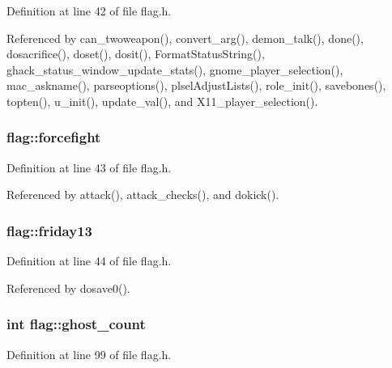Definition at line 42 of file flag.\+h.



Referenced by can\+\_\+twoweapon(), convert\+\_\+arg(), demon\+\_\+talk(), done(), dosacrifice(), doset(), dosit(), Format\+Status\+String(), ghack\+\_\+status\+\_\+window\+\_\+update\+\_\+stats(), gnome\+\_\+player\+\_\+selection(), mac\+\_\+askname(), parseoptions(), plsel\+Adjust\+Lists(), role\+\_\+init(), savebones(), topten(), u\+\_\+init(), update\+\_\+val(), and X11\+\_\+player\+\_\+selection().

\hypertarget{structflag_a527b68a0e2b522d3233eff485aa5f3fc}{
\subsubsection[{forcefight}]{ flag\+::forcefight}}\label{structflag_a527b68a0e2b522d3233eff485aa5f3fc}


Definition at line 43 of file flag.\+h.



Referenced by attack(), attack\+\_\+checks(), and dokick().

\hypertarget{structflag_acf8e0f21621c7af03112ca1280d2bf2e}{
\subsubsection[{friday13}]{ flag\+::friday13}}\label{structflag_acf8e0f21621c7af03112ca1280d2bf2e}


Definition at line 44 of file flag.\+h.



Referenced by dosave0().

\hypertarget{structflag_a7c8d492cee8daf2733b18954793990e3}{
\subsubsection[{ghost\+\_\+count}]{\setlength{\rightskip}{0pt plus 5cm}int flag\+::ghost\+\_\+count}}\label{structflag_a7c8d492cee8daf2733b18954793990e3}


Definition at line 99 of file flag.\+h.



